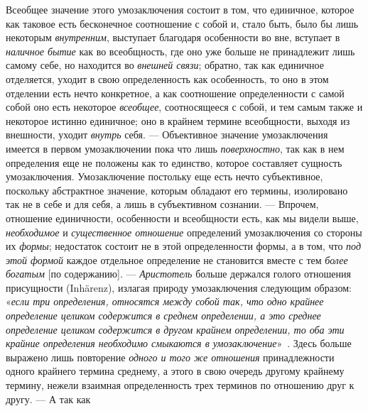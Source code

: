 \documentclass[twoside]{article}
\begin{document}
{{{Всеобщее значение этого умозаключения состоит в том, что
единичное, которое как таковое есть бесконечное соотношение с собой и,
стало быть, было бы лишь некоторым
{\em внутренним},
выступает благодаря особенности во вне, вступает в
{\em наличное бытие} как
во всеобщность, где оно уже больше не принадлежит лишь самому себе, но
находится во {\em внешней связи};
обратно, так как единичное отделяется, уходит в свою
определенность как особенность, то оно в этом отделении есть
нечто конкретное, а как соотношение определенности с самой собой оно есть
некоторое {\em всеобщее},
соотносящееся с собой, и тем самым также и некоторое истинно
единичное; оно в крайнем термине всеобщности, выходя из внешности, уходит
{\em внутрь} себя. —
Объективное значение умозаключения имеется в первом
умозаключении пока что лишь
{\em поверхностно}, так
как в нем определения еще не положены как то единство, которое составляет
сущность умозаключения. Умозаключение постольку еще есть нечто
субъективное, поскольку абстрактное значение, которым обладают его термины,
изолировано так не в себе и для себя, а лишь в субъективном сознании. —
Впрочем, отношение единичности, особенности и всеобщности
есть, как мы видели выше,
{\em необходимое} и
{\em существенное отношение}
определений умозаключения со стороны их
{\em формы}; недостаток
состоит не в этой определенности формы, а в том, что
{\em под этой формой}
каждое отдельное определение не становится вместе с тем
{\em более богатым} [по
содержанию]. — {\em Аристотель}
больше держался голого отношения присущности (Inhärenz),
излагая природу умозаключения следующим образом:
«{\em если три определения, относятся
между собой так, что одно крайнее определение целиком содержится в среднем
определении, а это среднее определение целиком содержится в другом крайнем
определении, то оба эти крайние определения необходимо смыкаются в
умозаключение}»~\label{bkm:bm50}.
Здесь больше выражено лишь повторение
{\em одного и того же отношения}
принадлежности одного крайнего термина среднему, а этого в
свою очередь другому крайнему термину, нежели взаимная определенность трех
терминов по отношению друг к другу. — А так как
}}}
\end{document}
